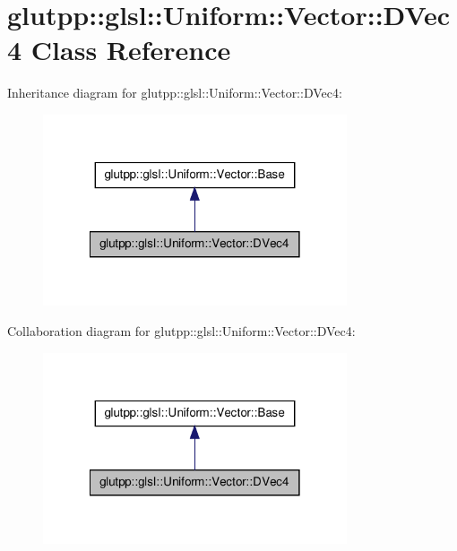 \hypertarget{classglutpp_1_1glsl_1_1Uniform_1_1Vector_1_1DVec4}{\section{glutpp\-:\-:glsl\-:\-:\-Uniform\-:\-:\-Vector\-:\-:\-D\-Vec4 \-Class \-Reference}
\label{classglutpp_1_1glsl_1_1Uniform_1_1Vector_1_1DVec4}
}


\-Inheritance diagram for glutpp\-:\-:glsl\-:\-:\-Uniform\-:\-:\-Vector\-:\-:\-D\-Vec4\-:
\nopagebreak
\begin{figure}[H]
\begin{center}
\leavevmode
\includegraphics[width=254pt]{classglutpp_1_1glsl_1_1Uniform_1_1Vector_1_1DVec4__inherit__graph}
\end{center}
\end{figure}


\-Collaboration diagram for glutpp\-:\-:glsl\-:\-:\-Uniform\-:\-:\-Vector\-:\-:\-D\-Vec4\-:
\nopagebreak
\begin{figure}[H]
\begin{center}
\leavevmode
\includegraphics[width=254pt]{classglutpp_1_1glsl_1_1Uniform_1_1Vector_1_1DVec4__coll__graph}
\end{center}
\end{figure}
